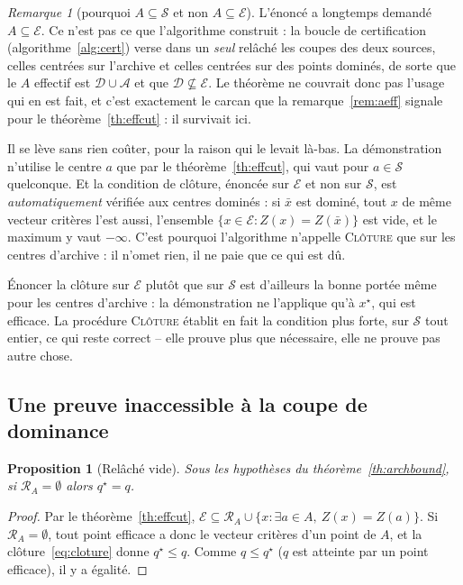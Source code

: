\documentclass[11pt,a4paper]{article}
\theoremstyle{plain}
\newtheorem{proposition}[theorem]{Proposition}
\theoremstyle{remark}
\newtheorem{remark}{Remarque}
\newcommand{\Ecal}{\mathcal{E}}
\newcommand{\Scal}{\mathcal{S}}
\newcommand{\Rcal}{\mathcal{R}}
\newcommand{\Acal}{\mathcal{A}}
\newcommand{\qs}{q^{\star}}
\begin{document}
\begin{remark}[pourquoi $A\subseteq\Scal$ et non $A\subseteq\Ecal$]
\label{rem:melange}
L'énoncé a longtemps demandé $A\subseteq\Ecal$. Ce n'est pas ce que
l'algorithme construit : la boucle de certification
(algorithme~\ref{alg:cert}) verse dans un \emph{seul} relâché les coupes
des deux sources, celles centrées sur l'archive et celles centrées sur des
points dominés, de sorte que le $A$ effectif est $\mathcal{D}\cup\Acal$ et
que $\mathcal{D}\not\subseteq\Ecal$. Le théorème ne couvrait donc pas
l'usage qui en est fait, et c'est exactement le carcan que la
remarque~\ref{rem:aeff} signale pour le théorème~\ref{th:effcut} : il
survivait ici.

Il se lève sans rien coûter, pour la raison qui le levait là-bas. La
démonstration n'utilise le centre $a$ que par le
théorème~\ref{th:effcut}, qui vaut pour $a\in\Scal$ quelconque. Et la
condition de clôture, énoncée sur $\Ecal$ et non sur $\Scal$, est
\emph{automatiquement} vérifiée aux centres dominés : si $\bar x$ est
dominé, tout $x$ de même vecteur critères l'est aussi, l'ensemble
$\{x\in\Ecal : Z(x)=Z(\bar x)\}$ est vide, et le maximum y vaut $-\infty$.
C'est pourquoi l'algorithme n'appelle \textsc{Clôture} que sur les centres
d'archive : il n'omet rien, il ne paie que ce qui est dû.

Énoncer la clôture sur $\Ecal$ plutôt que sur $\Scal$ est d'ailleurs la
bonne portée même pour les centres d'archive : la démonstration ne
l'applique qu'à $x^{\star}$, qui est efficace. La procédure
\textsc{Clôture} établit en fait la condition plus forte, sur $\Scal$ tout
entier, ce qui reste correct -- elle prouve plus que nécessaire, elle ne
prouve pas autre chose.
\end{remark}

\subsection{Une preuve inaccessible à la coupe de dominance}

\begin{proposition}[Relâché vide]\label{prop:vide}
Sous les hypothèses du théorème~\ref{th:archbound}, si $\Rcal_A=\emptyset$
alors $\qs=q$.
\end{proposition}

\begin{proof}
Par le théorème~\ref{th:effcut},
$\Ecal\subseteq\Rcal_A\cup\{x:\exists a\in A,\ Z(x)=Z(a)\}$. Si
$\Rcal_A=\emptyset$, tout point efficace a donc le vecteur critères d'un
point de $A$, et la clôture~\eqref{eq:cloture} donne $\qs\le q$. Comme
$q\le\qs$ ($q$ est atteinte par un point efficace), il y a égalité.
\end{proof}
\end{document}
